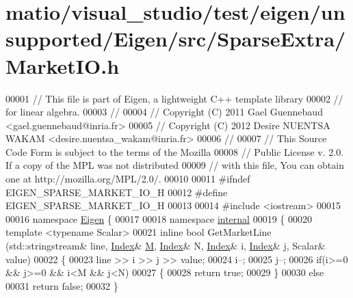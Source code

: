 \hypertarget{matio_2visual__studio_2test_2eigen_2unsupported_2_eigen_2src_2_sparse_extra_2_market_i_o_8h_source}{}\section{matio/visual\+\_\+studio/test/eigen/unsupported/\+Eigen/src/\+Sparse\+Extra/\+Market\+IO.h}
\label{matio_2visual__studio_2test_2eigen_2unsupported_2_eigen_2src_2_sparse_extra_2_market_i_o_8h_source}

\begin{DoxyCode}
00001 \textcolor{comment}{// This file is part of Eigen, a lightweight C++ template library}
00002 \textcolor{comment}{// for linear algebra.}
00003 \textcolor{comment}{//}
00004 \textcolor{comment}{// Copyright (C) 2011 Gael Guennebaud <gael.guennebaud@inria.fr>}
00005 \textcolor{comment}{// Copyright (C) 2012 Desire NUENTSA WAKAM <desire.nuentsa\_wakam@inria.fr>}
00006 \textcolor{comment}{//}
00007 \textcolor{comment}{// This Source Code Form is subject to the terms of the Mozilla}
00008 \textcolor{comment}{// Public License v. 2.0. If a copy of the MPL was not distributed}
00009 \textcolor{comment}{// with this file, You can obtain one at http://mozilla.org/MPL/2.0/.}
00010 
00011 \textcolor{preprocessor}{#ifndef EIGEN\_SPARSE\_MARKET\_IO\_H}
00012 \textcolor{preprocessor}{#define EIGEN\_SPARSE\_MARKET\_IO\_H}
00013 
00014 \textcolor{preprocessor}{#include <iostream>}
00015 
00016 \textcolor{keyword}{namespace }\hyperlink{namespace_eigen}{Eigen} \{ 
00017 
00018 \textcolor{keyword}{namespace }\hyperlink{namespaceinternal}{internal} 
00019 \{
00020   \textcolor{keyword}{template} <\textcolor{keyword}{typename} Scalar>
00021   \textcolor{keyword}{inline} \textcolor{keywordtype}{bool} GetMarketLine (std::stringstream& line, \hyperlink{namespace_eigen_a62e77e0933482dafde8fe197d9a2cfde}{Index}& \hyperlink{group___core___module_class_eigen_1_1_matrix}{M}, \hyperlink{namespace_eigen_a62e77e0933482dafde8fe197d9a2cfde}{Index}& N, 
      \hyperlink{namespace_eigen_a62e77e0933482dafde8fe197d9a2cfde}{Index}& i, \hyperlink{namespace_eigen_a62e77e0933482dafde8fe197d9a2cfde}{Index}& j, Scalar& value)
00022   \{
00023     line >> i >> j >> value;
00024     i--;
00025     j--;
00026     \textcolor{keywordflow}{if}(i>=0 && j>=0 && i<M && j<N)
00027     \{
00028       \textcolor{keywordflow}{return} \textcolor{keyword}{true}; 
00029     \}
00030     \textcolor{keywordflow}{else}
00031       \textcolor{keywordflow}{return} \textcolor{keyword}{false};
00032   \}

\end{DoxyCode}
